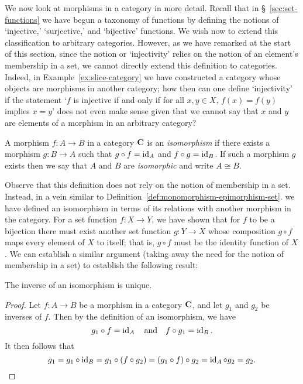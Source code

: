 
\bigskip

We now look at morphisms in a category in more detail. Recall that in
\S~\ref{sec:set-functions} we have begun a taxonomy of functions by defining the
notions of `injective,' `surjective,' and `bijective' functions. We wish now to
extend this classification to arbitrary categories. However, as we have remarked
at the start of this section, since the notion or `injectivity' relies on the
notion of an element's membership in a set, we cannot directly extend this
definition to categories. Indeed, in Example~\ref{ex:slice-category} we have
constructed a category whose objects are morphisms in another category; how then
can one define `injectivity' if the statement `\(f\) is injective if and only if
for all \(x, y \in X\), \(f(x) = f(y)\) implies \(x = y\)' does not even make
sense given that we cannot say that \(x\) and \(y\) are elements of a morphism
in an arbitrary category? 

\begin{definition}[Isomorphism]
    A morphism \(f: A \to B\) in a category \(\mathbf{C}\) is an
    \emph{isomorphism} if there exists a morphism \(g: B \to A\) such that \(g
    \circ f = \operatorname{id}_A\) and \(f \circ g = \operatorname{id}_B\). If such a morphism \(g\) exists
    then we say that \(A\) and \(B\) are \emph{isomorphic} and write \(A \cong
    B\).
\end{definition}

Observe that this definition does not rely on the notion of membership in a set.
Instead, in a vein similar to Definition~\ref{def:monomorphism-epimorphism-set}.
we have defined an isomorphism in terms of its relations with another morphism
in the category. For a set function \(f : X \to Y\), we have shown that for
\(f\) to be a bijection there must exist another set function \(g: Y \to X\)
whose composition \(g \circ f\) maps every element of \(X\) to itself; that is,
\(g \circ f\) must be the identity function of \(X\). We can establish a similar
argument (taking away the need for the notion of membership in a set) to
establish the following result:

\begin{theorem}
    \label{thm:isomorphism-unique-inverse-category}
	The inverse of an isomorphism is unique.
\end{theorem}

\begin{proof}
	Let \(f : A \to B\) be a morphism in a category \(\mathbf{C}\), and let
	\(g_1\) and \(g_2\) be inverses of \(f\). Then by the definition of an
	isomorphism, we have
    \[
        g_1 \circ f = \operatorname{id}_A \quad \text{and} \quad f \circ g_1 = \operatorname{id}_B.
    \]
    It then follows that
    \[
        g_1 = g_1 \circ \operatorname{id}_B = g_1 \circ (f \circ g_2) = (g_1 \circ f) \circ g_2 = \operatorname{id}_A \circ g_2 = g_2.
    \]
\end{proof}

